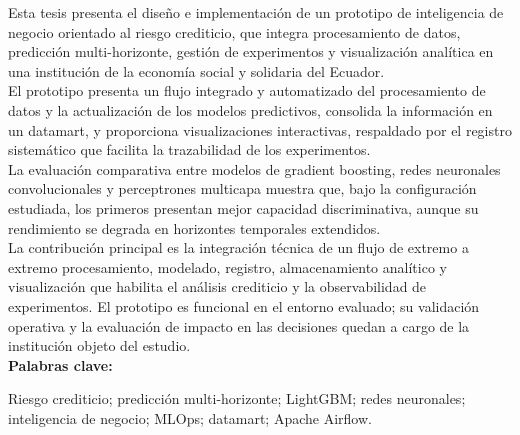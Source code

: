 Esta tesis presenta el diseño e implementación de un prototipo de inteligencia de negocio orientado al riesgo crediticio, que integra procesamiento de datos, predicción multi-horizonte, gestión de experimentos y visualización analítica en una institución de la economía social y solidaria del Ecuador.\\

El prototipo presenta un flujo integrado y automatizado del procesamiento de datos y la actualización de los modelos predictivos, consolida la información en un datamart, y proporciona visualizaciones interactivas, respaldado por el registro sistemático que facilita la trazabilidad de los experimentos.\\

La evaluación comparativa entre modelos de gradient boosting, redes neuronales convolucionales y perceptrones multicapa muestra que, bajo la configuración estudiada, los primeros presentan mejor capacidad discriminativa, aunque su rendimiento se degrada en horizontes temporales extendidos.\\

La contribución principal es la integración técnica de un flujo de extremo a extremo procesamiento, modelado, registro, almacenamiento analítico y visualización que habilita el análisis crediticio y la observabilidad de experimentos. El prototipo es funcional en el entorno evaluado; su validación operativa y la evaluación de impacto en las decisiones quedan a cargo de la institución objeto del estudio.\\

\noindent\textbf{Palabras clave:}

Riesgo crediticio; predicción multi-horizonte; LightGBM; redes neuronales; inteligencia de negocio; MLOps; datamart; Apache Airflow.
